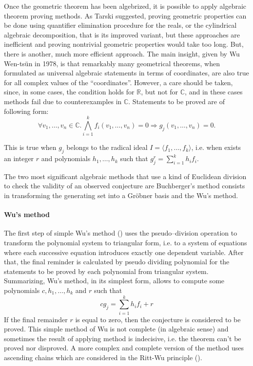 \documentclass[final,1p,times,authoryear]{elsarticle}
\begin{document}
Once the geometric theorem has been algebrized, it is possible to
apply algebraic theorem proving methods.  As Tarski suggested, proving
geometric properties can be done using quantifier elimination
procedure for the reals, or the cylindrical algebraic decomposition,
that is its improved variant, but these approaches are inefficient and
proving nontrivial geometric properties would take too long. But,
there is another, much more efficient approach. The main insight,
given by Wu Wen-ts\"un in 1978, is that remarkably many geometrical
theorems, when formulated as universal algebraic statements in terms
of coordinates, are also true for all complex values of the
``coordinates''. However, a care should be taken, since, in some
cases, the condition holds for $\mathbb{R}$, but not for $\mathbb{C}$,
and in these cases methods fail due to counterexamples in
$\mathbb{C}$. Statements to be proved are of following form:
$$\forall v_1, \ldots, v_n \in \mathbb{C}. \bigwedge_{i = 1}^{k} f_i(v_1, \ldots, v_n) = 0 \Longrightarrow g_j(v_1, \ldots, v_n) = 0.$$

This is true when $g_j$ belongs to the radical ideal $I = \langle f_1,
\ldots, f_k \rangle$, i.e. when exists an integer $r$ and polynomials
$h_1, \ldots, h_k$ such that $g_j^r = \sum_{i=1}^k h_if_i$.

The two most significant algebraic methods that use a kind of
Euclidean division to check the validity of an observed conjecture are
Buchberger's method consists in transforming the generating set into a
Gr\"obner basis and the Wu's method.

\paragraph{Wu's method}

The first step of simple Wu's method (\cite{wu}) uses the
pseudo--division operation to transform the polynomial system to
triangular form, i.e. to a system of equations where each successive
equation introduces exactly one dependent variable. After that, the
final reminder is calculated by pseudo dividing polynomial for the
statements to be proved by each polynomial from triangular system.
Summarizing, Wu's method, in its simplest form, allows to compute some
polynomials $c, h_1, \ldots, h_k$ and $r$ such that
$$cg_j = \sum_{i=1}^{k}h_if_i + r$$ If the final remainder $r$ is
equal to zero, then the conjecture is considered to be proved. This
simple method of Wu is not complete (in algebraic sense) and
sometimes the result of applying method is indecisive, i.e. the
theorem can't be proved nor disproved. A more complex and complete
version of the method uses ascending chains which are considered in
the Ritt-Wu principle (\cite{ritt}).
\end{document}
